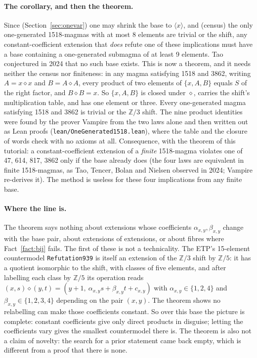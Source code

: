 \documentclass[11pt]{article}
\theoremstyle{definition}\newtheorem{example}{Example}\newtheorem{exercise}{Exercise}
\theoremstyle{remark}\newtheorem*{remark}{Remark}
\newcommand{\op}{\diamond}
\newcommand{\Z}{\mathbb{Z}}
\begin{document}
\paragraph{The corollary, and then the theorem.} Since (Section~\ref{sec:onevar}) one may shrink the base to $\langle x\rangle$, and (census) the only one-generated 1518-magmas with at most 8 elements are trivial or the shift, any constant-coefficient extension that \emph{does} refute one of these implications must have a base containing a one-generated submagma of at least 9 elements. Tao conjectured in 2024 that no such base exists. This is now a theorem, and it needs neither the census nor finiteness: in any magma satisfying 1518 and 3862, writing $A=x\op x$ and $B=A\op A$, every product of two elements of $\{x,A,B\}$ equals $S$ of the right factor, and $B\op B=x$. So $\{x,A,B\}$ is closed under $\op$, carries the shift's multiplication table, and has one element or three. Every one-generated magma satisfying 1518 and 3862 is trivial or the $\Z/3$ shift. The nine product identities were found by the prover Vampire from the two laws alone and then written out as Lean proofs (\texttt{lean/OneGenerated1518.lean}), where the table and the closure of words check with no axioms at all. Consequence, with the theorem of this tutorial: a constant-coefficient extension of a \emph{finite} 1518-magma violates one of 47, 614, 817, 3862 only if the base already does (the four laws are equivalent in finite 1518-magmas, as Tao, Tencer, Bolan and Nielsen observed in 2024; Vampire re-derives it). The method is useless for these four implications from any finite base.

\paragraph{Where the line is.} The theorem says nothing about extensions whose coefficients $\alpha_{x,y},\beta_{x,y}$ change with the base pair, about extensions of extensions, or about fibres where Fact~\ref{fact:bij} fails. The first of these is not a technicality. The ETP's 15-element countermodel \texttt{Refutation939} is itself an extension of the $\Z/3$ shift by $\Z/5$: it has a quotient isomorphic to the shift, with classes of five elements, and after labelling each class by $\Z/5$ its operation reads $(x,s)\op(y,t)=(y+1,\ \alpha_{x,y}s+\beta_{x,y}t+c_{x,y})$ with $\alpha_{x,y}\in\{1,2,4\}$ and $\beta_{x,y}\in\{1,2,3,4\}$ depending on the pair $(x,y)$. The theorem shows no relabelling can make those coefficients constant. So over this base the picture is complete: constant coefficients give only direct products in disguise; letting the coefficients vary gives the smallest countermodel there is. The theorem is also not a claim of novelty: the search for a prior statement came back empty, which is different from a proof that there is none.
\end{document}
